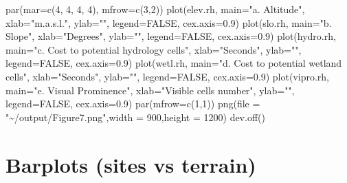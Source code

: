 \documentclass[
]{article}
\newenvironment{Shaded}{\begin{snugshade}}{\end{snugshade}}
\newcommand{\AttributeTok}[1]{\textcolor[rgb]{0.77,0.63,0.00}{#1}}
\newcommand{\ConstantTok}[1]{\textcolor[rgb]{0.00,0.00,0.00}{#1}}
\newcommand{\DecValTok}[1]{\textcolor[rgb]{0.00,0.00,0.81}{#1}}
\newcommand{\FloatTok}[1]{\textcolor[rgb]{0.00,0.00,0.81}{#1}}
\newcommand{\FunctionTok}[1]{\textcolor[rgb]{0.00,0.00,0.00}{#1}}
\newcommand{\NormalTok}[1]{#1}
\newcommand{\StringTok}[1]{\textcolor[rgb]{0.31,0.60,0.02}{#1}}
\begin{document}
\begin{Shaded}
\begin{Highlighting}[]
\FunctionTok{par}\NormalTok{(}\AttributeTok{mar=}\FunctionTok{c}\NormalTok{(}\DecValTok{4}\NormalTok{, }\DecValTok{4}\NormalTok{, }\DecValTok{4}\NormalTok{, }\DecValTok{4}\NormalTok{), }\AttributeTok{mfrow=}\FunctionTok{c}\NormalTok{(}\DecValTok{3}\NormalTok{,}\DecValTok{2}\NormalTok{))}
\FunctionTok{plot}\NormalTok{(elev.rh, }\AttributeTok{main=}\StringTok{"a. Altitude"}\NormalTok{, }\AttributeTok{xlab=}\StringTok{"m.a.s.l."}\NormalTok{, }\AttributeTok{ylab=}\StringTok{""}\NormalTok{, }\AttributeTok{legend=}\ConstantTok{FALSE}\NormalTok{, }\AttributeTok{cex.axis=}\FloatTok{0.9}\NormalTok{)}
\FunctionTok{plot}\NormalTok{(slo.rh, }\AttributeTok{main=}\StringTok{"b. Slope"}\NormalTok{, }\AttributeTok{xlab=}\StringTok{"Degrees"}\NormalTok{, }\AttributeTok{ylab=}\StringTok{""}\NormalTok{, }\AttributeTok{legend=}\ConstantTok{FALSE}\NormalTok{, }\AttributeTok{cex.axis=}\FloatTok{0.9}\NormalTok{)}
\FunctionTok{plot}\NormalTok{(hydro.rh, }\AttributeTok{main=}\StringTok{"c. Cost to potential hydrology cells"}\NormalTok{, }\AttributeTok{xlab=}\StringTok{"Seconds"}\NormalTok{, }\AttributeTok{ylab=}\StringTok{""}\NormalTok{, }\AttributeTok{legend=}\ConstantTok{FALSE}\NormalTok{, }\AttributeTok{cex.axis=}\FloatTok{0.9}\NormalTok{)}
\FunctionTok{plot}\NormalTok{(wetl.rh, }\AttributeTok{main=}\StringTok{"d. Cost to potential wetland cells"}\NormalTok{, }\AttributeTok{xlab=}\StringTok{"Seconds"}\NormalTok{, }\AttributeTok{ylab=}\StringTok{""}\NormalTok{, }\AttributeTok{legend=}\ConstantTok{FALSE}\NormalTok{, }\AttributeTok{cex.axis=}\FloatTok{0.9}\NormalTok{)}
\FunctionTok{plot}\NormalTok{(vipro.rh, }\AttributeTok{main=}\StringTok{"e. Visual Prominence"}\NormalTok{, }\AttributeTok{xlab=}\StringTok{"Visible cells number"}\NormalTok{, }\AttributeTok{ylab=}\StringTok{""}\NormalTok{, }\AttributeTok{legend=}\ConstantTok{FALSE}\NormalTok{, }\AttributeTok{cex.axis=}\FloatTok{0.9}\NormalTok{)}
\FunctionTok{par}\NormalTok{(}\AttributeTok{mfrow=}\FunctionTok{c}\NormalTok{(}\DecValTok{1}\NormalTok{,}\DecValTok{1}\NormalTok{))}
\FunctionTok{png}\NormalTok{(}\AttributeTok{file =} \StringTok{"\textasciitilde{}/output/Figure7.png"}\NormalTok{,}\AttributeTok{width =} \DecValTok{900}\NormalTok{,}\AttributeTok{height =} \DecValTok{1200}\NormalTok{)}
\FunctionTok{dev.off}\NormalTok{()}
\end{Highlighting}
\end{Shaded}

\hypertarget{barplots-sites-vs-terrain}{%
\section{Barplots (sites vs terrain)}\label{barplots-sites-vs-terrain}}
\end{document}
